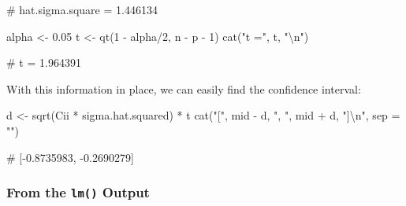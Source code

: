 \documentclass[
  a4paper,
]{article}
\newenvironment{Shaded}{\begin{snugshade}}{\end{snugshade}}
\newcommand{\AttributeTok}[1]{\textcolor[rgb]{0.77,0.63,0.00}{#1}}
\newcommand{\DecValTok}[1]{\textcolor[rgb]{0.00,0.00,0.81}{#1}}
\newcommand{\FloatTok}[1]{\textcolor[rgb]{0.00,0.00,0.81}{#1}}
\newcommand{\FunctionTok}[1]{\textcolor[rgb]{0.00,0.00,0.00}{#1}}
\newcommand{\NormalTok}[1]{#1}
\newcommand{\OtherTok}[1]{\textcolor[rgb]{0.56,0.35,0.01}{#1}}
\newcommand{\SpecialCharTok}[1]{\textcolor[rgb]{0.00,0.00,0.00}{#1}}
\newcommand{\StringTok}[1]{\textcolor[rgb]{0.31,0.60,0.02}{#1}}
\theoremstyle{definition}
\theoremstyle{definition}
\theoremstyle{definition}
\theoremstyle{definition}
\theoremstyle{remark}
\begin{document}
\begin{Shaded}
\begin{Highlighting}[]
\NormalTok{\# hat.sigma.square = 1.446134}
\end{Highlighting}
\end{Shaded}

\begin{Shaded}
\begin{Highlighting}[]
\NormalTok{alpha }\OtherTok{\textless{}{-}} \FloatTok{0.05}
\NormalTok{t }\OtherTok{\textless{}{-}} \FunctionTok{qt}\NormalTok{(}\DecValTok{1} \SpecialCharTok{{-}}\NormalTok{ alpha}\SpecialCharTok{/}\DecValTok{2}\NormalTok{, n }\SpecialCharTok{{-}}\NormalTok{ p }\SpecialCharTok{{-}} \DecValTok{1}\NormalTok{)}
\FunctionTok{cat}\NormalTok{(}\StringTok{"t ="}\NormalTok{, t, }\StringTok{"}\SpecialCharTok{\textbackslash{}n}\StringTok{"}\NormalTok{)}
\end{Highlighting}
\end{Shaded}

\begin{Shaded}
\begin{Highlighting}[]
\NormalTok{\# t = 1.964391}
\end{Highlighting}
\end{Shaded}

With this information in place, we can easily find the confidence
interval:

\begin{Shaded}
\begin{Highlighting}[]
\NormalTok{d }\OtherTok{\textless{}{-}} \FunctionTok{sqrt}\NormalTok{(Cii }\SpecialCharTok{*}\NormalTok{ sigma.hat.squared) }\SpecialCharTok{*}\NormalTok{ t}
\FunctionTok{cat}\NormalTok{(}\StringTok{"["}\NormalTok{, mid }\SpecialCharTok{{-}}\NormalTok{ d, }\StringTok{", "}\NormalTok{, mid }\SpecialCharTok{+}\NormalTok{ d, }\StringTok{"]}\SpecialCharTok{\textbackslash{}n}\StringTok{"}\NormalTok{, }\AttributeTok{sep =} \StringTok{""}\NormalTok{)}
\end{Highlighting}
\end{Shaded}

\begin{Shaded}
\begin{Highlighting}[]
\NormalTok{\# [{-}0.8735983, {-}0.2690279]}
\end{Highlighting}
\end{Shaded}

\hypertarget{from-the-lm-output}{%
\subsubsection{\texorpdfstring{From the \texttt{lm()} Output}{From the lm() Output}}\label{from-the-lm-output}}
\end{document}
